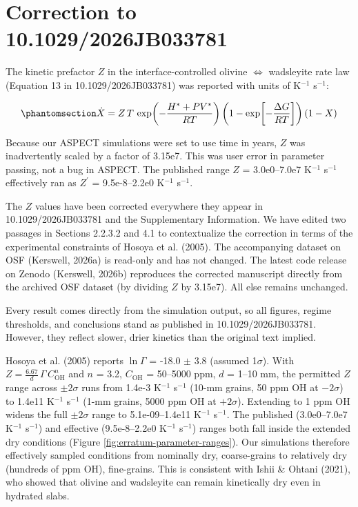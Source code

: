 \documentclass[
]{article}
\author{}
\date{}
\begin{document}
\section*{Correction to 10.1029/2026JB033781}\label{sec:correction}

The kinetic prefactor \(Z\) in the interface-controlled olivine
\(\Leftrightarrow\) wadsleyite rate law (Equation 13 in
10.1029/2026JB033781) was reported with units of K\(^{-1}\) s\(^{-1}\):

\begin{equation}\protect\phantomsection\label{eq:reaction-rate}{\dot{X} = Z\, T\, \exp\!\left(-\frac{H^{\ast} + P V^{\ast}}{R T}\right) \left(1 - \exp\!\left[-\frac{\Delta G}{R T}\right]\right) \left(1 - X\right)}\end{equation}

Because our ASPECT simulations were set to use time in years, \(Z\) was
inadvertently scaled by a factor of 3.15e7. This was user error in
parameter passing, not a bug in ASPECT. The published range \(Z\) =
3.0e0--7.0e7 K\(^{-1}\) s\(^{-1}\) effectively ran as \(Z^{\prime}\) =
9.5e-8--2.2e0 K\(^{-1}\) s\(^{-1}\).

The \(Z\) values have been corrected everywhere they appear in
10.1029/2026JB033781 and the Supplementary Information. We have edited
two passages in Sections 2.2.3.2 and 4.1 to contextualize the correction
in terms of the experimental constraints of Hosoya et al. (2005). The
accompanying dataset on OSF (Kerswell, 2026a) is read-only and has not
changed. The latest code release on Zenodo (Kerswell, 2026b) reproduces
the corrected manuscript directly from the archived OSF dataset (by
dividing \(Z\) by 3.15e7). All else remains unchanged.

Every result comes directly from the simulation output, so all figures,
regime thresholds, and conclusions stand as published in
10.1029/2026JB033781. However, they reflect slower, drier kinetics than
the original text implied.

Hosoya et al. (2005) reports \(\ln \Gamma\) = -18.0 \(\pm\) 3.8 (assumed
1\(\sigma\)). With \(Z = \frac{6.67}{d}\, \Gamma\, C_\mathrm{OH}^n\) and
\(n\) = 3.2, \(C_\mathrm{OH}\) = 50--5000 ppm, \(d\) = 1--10 mm, the
permitted \(Z\) range across \(\pm 2\sigma\) runs from 1.4e-3 K\(^{-1}\)
s\(^{-1}\) (10-mm grains, 50 ppm OH at \(-2\sigma\)) to 1.4e11
K\(^{-1}\) s\(^{-1}\) (1-mm grains, 5000 ppm OH at \(+2\sigma\)).
Extending to 1 ppm OH widens the full \(\pm 2\sigma\) range to
5.1e-09--1.4e11 K\(^{-1}\) s\(^{-1}\). The published (3.0e0--7.0e7
K\(^{-1}\) s\(^{-1}\)) and effective (9.5e-8--2.2e0 K\(^{-1}\)
s\(^{-1}\)) ranges both fall inside the extended dry conditions (Figure
\ref{fig:erratum-parameter-ranges}). Our simulations therefore
effectively sampled conditions from nominally dry, coarse-grains to
relatively dry (hundreds of ppm OH), fine-grains. This is consistent
with Ishii \& Ohtani (2021), who showed that olivine and wadsleyite can
remain kinetically dry even in hydrated slabs.
\end{document}
